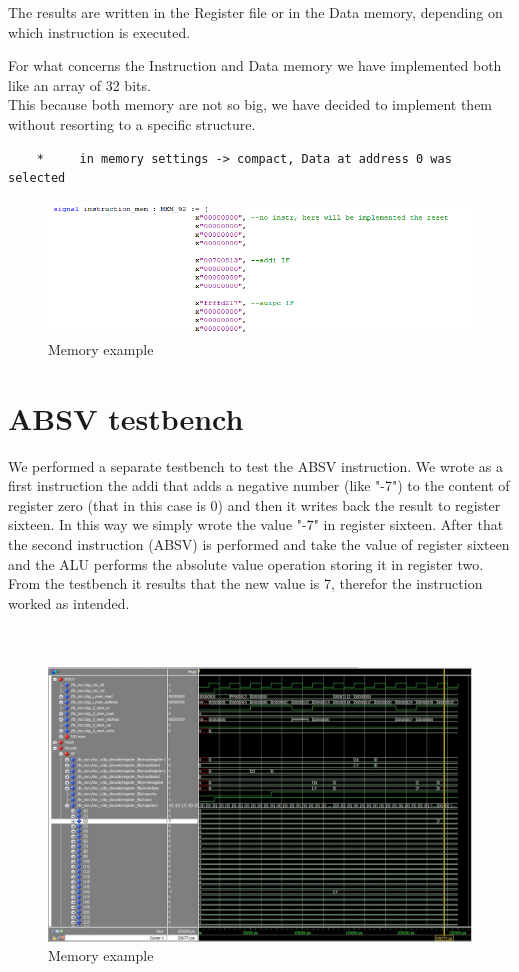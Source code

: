 The results are written in the Register file or in the Data memory, depending on which instruction is executed.

For what concerns the Instruction and Data memory we have implemented both like an array of 32 bits.\\
This because both memory are not so big, we have decided to implement them without resorting to a specific structure.\\

\begin{verbatim}
	*     in memory settings -> compact, Data at address 0 was selected
\end{verbatim}
\begin{figure}[h!]
	\centering
	\includegraphics[width=18cm]{./images/Imem}
	\caption{Memory example}
	\label{fig4.2}
\end{figure} 

\newpage
\section{ABSV testbench}

We performed a separate testbench to test the ABSV instruction. We wrote as a first instruction the addi that adds a negative number (like "-7") to the content of register zero (that in this case is 0) and then it writes back the result to register sixteen. In this way we simply wrote the value "-7" in register sixteen.
After that the second instruction (ABSV) is performed and take the value of register sixteen and the ALU performs the absolute value operation storing it in register two. From the testbench it results that the new value is 7, therefor the instruction worked as intended.\\\\\\

\begin{figure}[h!]
	\centering
	\includegraphics[width=18cm]{./images/TB_ABSV_waves}
	\caption{Memory example}
	\label{fig4.2}
\end{figure} 